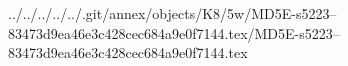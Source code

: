 ../../../../../.git/annex/objects/K8/5w/MD5E-s5223--83473d9ea46e3c428cec684a9e0f7144.tex/MD5E-s5223--83473d9ea46e3c428cec684a9e0f7144.tex
